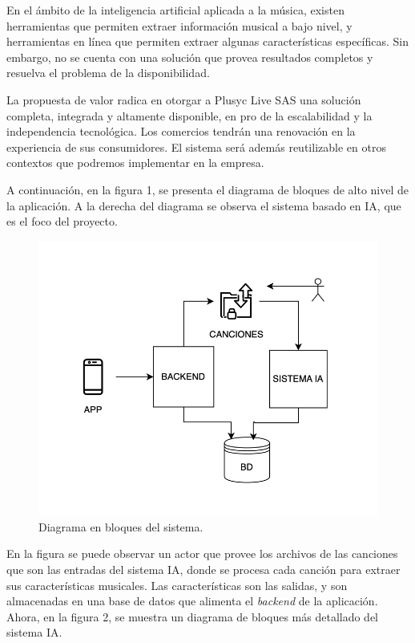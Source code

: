\documentclass[
11pt, %
]{charter}
\begin{document}
En el ámbito de la inteligencia artificial aplicada a la música, existen herramientas que permiten extraer información musical a bajo nivel, y herramientas en línea que permiten extraer algunas características específicas. Sin embargo, no se cuenta con una solución que provea resultados completos y resuelva el problema de la disponibilidad.

La propuesta de valor radica en otorgar a Plusyc Live SAS una solución completa, integrada y altamente disponible, en pro de la escalabilidad y la independencia tecnológica. Los comercios tendrán una renovación en la experiencia de sus consumidores. El sistema será además reutilizable en otros contextos que podremos implementar en la empresa.

A continuación, en la figura 1, se presenta el diagrama de bloques de alto nivel de la aplicación. A la derecha del diagrama se observa el sistema basado en IA, que es el foco del proyecto. 


\begin{figure}[htpb]
\centering 
\includegraphics[width=.65\textwidth]{./Figuras/diagBloques.png}
\caption{Diagrama en bloques del sistema.}
\label{fig:diagBloques}
\end{figure}

\vspace{25px}
En la figura se puede observar un actor que provee los archivos de las canciones que son las entradas del sistema IA, donde se procesa cada canción para extraer sus características musicales. Las características son las salidas, y son almacenadas en una base de datos que alimenta el \textit{backend} de la aplicación. Ahora, en la figura 2, se muestra un diagrama de bloques más detallado del sistema IA. 
\end{document}
